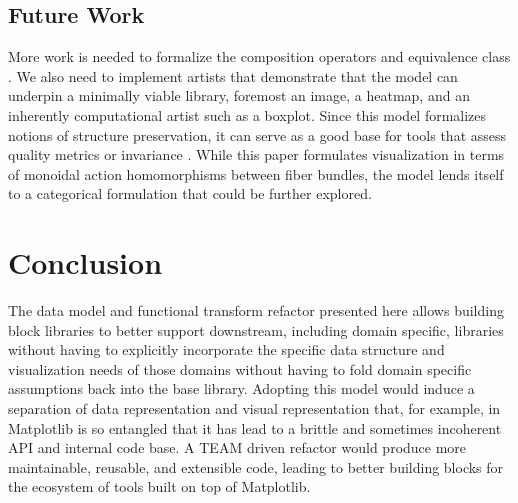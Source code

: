 \documentclass[journal]{vgtc}                %
\begin{document}
\subsection{Future Work}
More work is needed to formalize the composition operators and equivalence class \vartisteq. We also need to implement artists that demonstrate that the model can underpin a minimally viable library, foremost an image\cite{haber1990visualization,hansen2011visualization}, a heatmap\cite{wilkinsonHistoryClusterHeat2009,loua1873atlas}, and an inherently computational artist such as a boxplot\cite{wickham40YearsBoxplots2011}. Since this model formalizes notions of structure preservation, it can serve as a good base for tools that assess quality metrics\cite{bertiniQualityMetricsHighdimensional2011a} or invariance \cite{kindlmannAlgebraicProcessVisualization2014}. While this paper formulates visualization in terms of monoidal action homomorphisms between fiber bundles, the model lends itself to a categorical formulation\cite{fongInvitationAppliedCategory2019,milewskiCategoryTheoryProgrammers} that could be further explored. 

\section{Conclusion}
The data model and functional transform refactor presented here allows building block libraries to better support downstream, including domain specific, libraries without having to explicitly incorporate the 
specific data structure and visualization needs of those domains without having to fold domain specific assumptions back into the base library. Adopting this model would induce a separation of data representation and visual representation that, for example, in Matplotlib is so entangled that it has lead to a brittle and sometimes incoherent API and internal code base. A TEAM driven refactor would produce more maintainable, reusable, and extensible code, leading to better building blocks for the ecosystem of tools built on top of Matplotlib.



%

%
%
%

\end{document}
